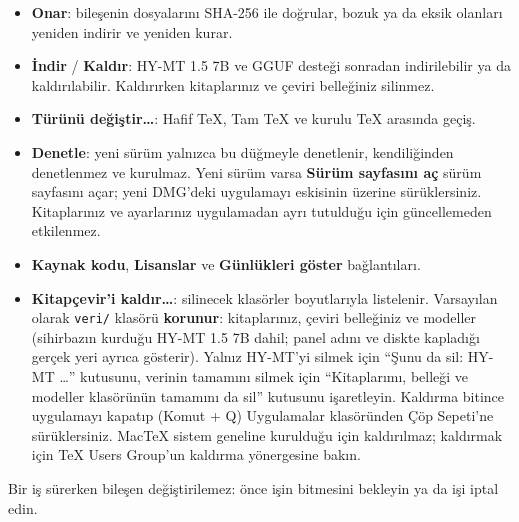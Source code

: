 \documentclass[11pt,a4paper]{article}
\newcommand{\dugme}[1]{\textsf{\bfseries #1}}
\newcommand{\dosya}[1]{\texttt{#1}}
\begin{document}
\begin{itemize}
  \item \dugme{Onar}: bileşenin dosyalarını SHA-256 ile doğrular, bozuk ya da
        eksik olanları yeniden indirir ve yeniden kurar.
  \item \dugme{İndir} / \dugme{Kaldır}: HY-MT 1.5 7B ve GGUF desteği sonradan
        indirilebilir ya da kaldırılabilir. Kaldırırken kitaplarınız ve çeviri
        belleğiniz silinmez.
  \item \dugme{Türünü değiştir\ldots}: Hafif TeX, Tam TeX ve kurulu TeX
        arasında geçiş.
  \item \dugme{Denetle}: yeni sürüm yalnızca bu düğmeyle denetlenir,
        kendiliğinden denetlenmez ve kurulmaz. Yeni sürüm varsa
        \dugme{Sürüm sayfasını aç} sürüm sayfasını açar; yeni DMG'deki
        uygulamayı eskisinin üzerine sürüklersiniz. Kitaplarınız ve
        ayarlarınız uygulamadan ayrı tutulduğu için güncellemeden etkilenmez.
  \item \dugme{Kaynak kodu}, \dugme{Lisanslar} ve \dugme{Günlükleri göster}
        bağlantıları.
  \item \dugme{Kitapçevir'i kaldır\ldots}: silinecek klasörler boyutlarıyla
        listelenir. Varsayılan olarak \dosya{veri/} klasörü \textbf{korunur}:
        kitaplarınız, çeviri belleğiniz ve modeller (sihirbazın kurduğu
        HY-MT 1.5 7B dahil; panel adını ve diskte kapladığı gerçek yeri
        ayrıca gösterir). Yalnız HY-MT'yi silmek için ``Şunu da sil: HY-MT
        \ldots'' kutusunu, verinin tamamını silmek için ``Kitaplarımı,
        belleği ve modeller klasörünün tamamını da sil'' kutusunu
        işaretleyin. Kaldırma bitince uygulamayı kapatıp (Komut + Q) Uygulamalar
        klasöründen Çöp Sepeti'ne sürüklersiniz. MacTeX sistem geneline
        kurulduğu için kaldırılmaz; kaldırmak için TeX Users Group'un kaldırma
        yönergesine bakın.
\end{itemize}

Bir iş sürerken bileşen değiştirilemez: önce işin bitmesini bekleyin ya da
işi iptal edin.
\end{document}
